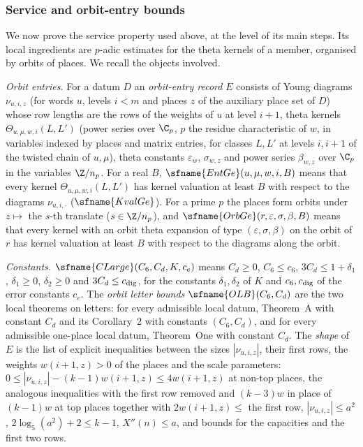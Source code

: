 \subsubsection*{Service and orbit-entry bounds}

We now prove the service property used above, at the level of its main steps. Its local ingredients are $p$-adic
estimates for the theta kernels of a member, organised by orbits of places. We recall the objects involved.

\emph{Orbit entries.} For a datum $D$ an \emph{orbit-entry record} $E$ consists of Young diagrams
$\nu_{u,i,z}$ (for words $u$, levels $i<m$ and places $z$ of the auxiliary place set of $D$) whose row lengths are
the rows of the weights of $u$ at level $i+1$, theta kernels $\Theta_{u,\mu,w,i}(L,L')$ (power series over $\C_p$,
$p$ the residue characteristic of $w$, in variables indexed by places and matrix entries, for classes $L,L'$ at levels
$i,i+1$ of the twisted chain of $u,\mu$), theta constants $\varepsilon_w$, $\sigma_{w,z}$ and power series $\beta_{w,z}$ over
$\C_p$ in the variables $\Z/n_p$. For a real $B$,
$\sfname{EntGe}(u,\mu,w,i,B)$ means that every kernel $\Theta_{u,\mu,w,i}(L,L')$ has kernel valuation at least $B$
with respect to the diagrams $\nu_{u,i,\cdot}$ ($\sfname{KvalGe}$). For a prime $p$ the places form orbits under
$z\mapsto$ the $s$-th translate ($s\in\Z/n_p$), and $\sfname{OrbGe}(r,\varepsilon,\sigma,\beta,B)$ means that every kernel
with an orbit theta expansion of type $(\varepsilon,\sigma,\beta)$ on the orbit of $r$ has kernel valuation at least
$B$ with respect to the diagrams along the orbit.

\emph{Constants.} $\sfname{CLarge}(C_6,C_d,K,c_e)$ means $C_d\ge0$, $C_6\le c_6$, $3C_d\le1+\delta_1$, $\delta_1\ge0$,
$\delta_2\ge0$ and $3C_d\le c_{\rm dig}$, for the constants $\delta_1,\delta_2$ of $K$ and $c_6,c_{\rm dig}$ of the error
constants $c_e$. The \emph{orbit letter bounds} $\sfname{OLB}(C_6,C_d)$ are the two local theorems on letters: for
every admissible local datum, Theorem~A with constant $C_d$ and its Corollary~2 with constants $(C_6,C_d)$, and for every
admissible one-place local datum, Theorem~One with constant $C_d$. The \emph{shape} of $E$ is the list of explicit
inequalities between the sizes $|\nu_{u,i,z}|$, their first rows, the weights $w(i+1,z)>0$ of the places and the scale
parameters: $0\le|\nu_{u,i,z}|-(k-1)w(i+1,z)\le4w(i+1,z)$ at non-top places, the analogous inequalities with the first
row removed and $(k-3)w$ in place of $(k-1)w$ at top places together with $2w(i+1,z)\le$ the first row, $|\nu_{u,i,z}|\le
a^2$, $2\log_5(a^2)+2\le k-1$, $X''(n)\le a$, and bounds for the capacities and the first two rows.

